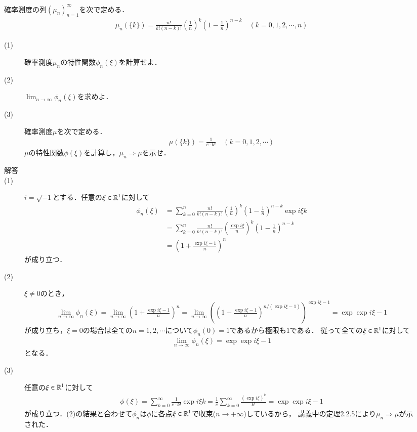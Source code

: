 \newpage
\begin{description}
	\item[] 確率測度の列$(\mu_n)_{n=1}^{\infty}$を次で定める．
		\begin{align}
			\mu_n(\{k\}) = \frac{n!}{k!(n-k)!} \left( \frac{1}{n} \right)^k \left( 1 - \frac{1}{n} \right)^{n-k} \quad (k=0,1,2,\cdots,n)
		\end{align}
		\begin{description}
			\item[(1)] 確率測度$\mu_n$の特性関数$\phi_n(\xi)$を計算せよ．
			\item[(2)] $\lim_{n \to \infty} \phi_n(\xi)$を求めよ．
			\item[(3)] 確率測度$\mu$を次で定める．
				\begin{align}
					\mu(\{k\}) = \frac{1}{e \cdot k!} \quad (k=0,1,2,\cdots)
				\end{align}
				$\mu$の特性関数$\phi(\xi)$を計算し，$\mu_n \Rightarrow \mu$を示せ．
		\end{description}
		\begin{description}
			\item[解答]
			\item[(1)] $i=\sqrt{-1}$とする．任意の$\xi \in \mathbb{R}^1$に対して
				\begin{align}
					\phi_n(\xi) &= \sum_{k=0}^{n} \frac{n!}{k!(n-k)!} \left( \frac{1}{n} \right)^k \left( 1 - \frac{1}{n}\right)^{n-k} \exp{i \xi k}  \\
					&= \sum_{k=0}^{n} \frac{n!}{k!(n-k)!} \left( \frac{\exp{i \xi}}{n} \right)^k \left( 1 - \frac{1}{n} \right)^{n-k} \\
					&= \left( 1 + \frac{\exp{i \xi} - 1}{n} \right)^n
				\end{align}
				が成り立つ．
			\item[(2)] $\xi \neq 0$のとき，
				\begin{align}
					\lim_{n \to \infty} \phi_n(\xi) = \lim_{n \to \infty} \left( 1 + \frac{\exp{i \xi} - 1}{n} \right)^n = \lim_{n \to \infty} \left( \left( 1 + \frac{\exp{i \xi} - 1}{n} \right)^{n/(\exp{i \xi} - 1)} \right)^{\exp{i \xi} - 1} = \exp{\exp{i \xi} - 1}
				\end{align}
				が成り立ち，$\xi = 0$の場合は全ての$n = 1,2,\cdots$について$\phi_n(0) = 1$であるから極限も$1$である．
				従って全ての$\xi \in \mathbb{R}^1$に対して
				\begin{align}
					\lim_{n \to \infty} \phi_n(\xi) = \exp{\exp{i \xi} - 1}
				\end{align}
				となる．
			\item[(3)] 任意の$\xi \in \mathbb{R}^1$に対して
				\begin{align}
					\phi(\xi) = \sum_{k=0}^{\infty} \frac{1}{e \cdot k!} \exp{i \xi k} = \frac{1}{e} \sum_{k=0}^{\infty} \frac{(\exp{i \xi})^k}{k!} = \exp{\exp{i \xi} - 1}
				\end{align}
				が成り立つ．(2)の結果と合わせて$\phi_n$は$\phi$に各点$\xi \in \mathbb{R}^1$で収束($n \to +\infty$)しているから，
				講義中の定理2.2.5により$\mu_n \Rightarrow \mu$が示された．
				\QED
		\end{description}
\end{description}